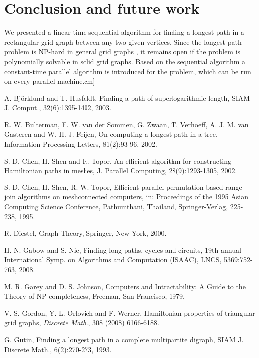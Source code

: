 \documentclass[preprint,12pt]{elsarticle}
\begin{document}
\section{Conclusion and future work} \label{ConclusionSect}
We presented a linear-time sequential algorithm for finding a longest path in a
rectangular grid graph between any two given vertices. Since the
longest path problem is NP-hard in general grid graphs
\cite{IPS:HPIGG}, it remains open if the problem is polynomially
solvable in solid grid
graphs. Based on the sequential algorithm a constant-time parallel algorithm
is introduced for the problem, which can be run on every parallel machine.\1cm]


\begin{thebibliography}{00}

A. Bj\"{o}rklund and T. Husfeldt, Finding a path of superlogarithmic
length, SIAM J. Comput., 32(6):1395-1402, 2003.

R. W. Bulterman, F. W. van der Sommen, G. Zwaan, T. Verhoeff, A. J.
M. van Gasteren and W. H. J. Feijen, On computing a longest path in
a tree, Information Processing Letters, 81(2):93-96, 2002.

S. D. Chen, H. Shen and R. Topor, An efficient algorithm for
constructing Hamiltonian paths in meshes, J. Parallel Computing,
28(9):1293-1305, 2002.

S. D. Chen, H. Shen, R. W. Topor, Efficient parallel
permutation-based range-join algorithms on meshconnected computers,
in: Proceedings of the 1995 Asian Computing Science Conference,
Pathumthani, Thailand, Springer-Verlag, 225-238, 1995.

R. Diestel, Graph Theory, Springer, New York, 2000.

H. N. Gabow and S. Nie, Finding long paths, cycles and circuits,
19th annual International Symp. on Algorithms and Computation
(ISAAC), LNCS, 5369:752-763, 2008.

M. R. Garey and D. S. Johnson, Computers and Intractability: A Guide
to the Theory of NP-completeness, Freeman, San Francisco, 1979.

{V. S. Gordon, Y. L. Orlovich and F. Werner, Hamiltonian properties
of triangular grid graphs, \em Discrete Math.}, 308 (2008)
6166-6188.

G. Gutin, Finding a longest path in a complete multipartite digraph,
SIAM J. Discrete Math., 6(2):270-273, 1993.


\end{thebibliography}
\end{document}
